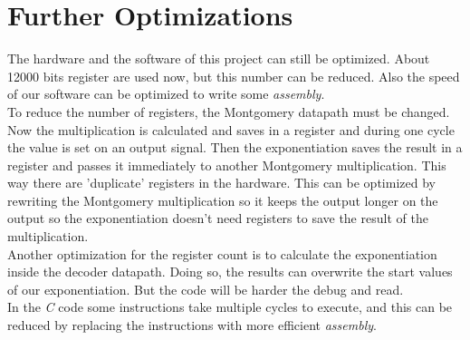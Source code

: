 \documentclass[a4paper]{article}
\begin{document}
\section{Further Optimizations}

The hardware and the software of this project can still be optimized. About 12000 bits register are used now, but this number can be reduced. Also the speed of our software can be optimized to write some \textit{assembly}.\\

To reduce the number of registers, the Montgomery datapath must be changed. Now the multiplication is calculated and saves in a register and during one cycle the value is set on an output signal. Then the exponentiation saves the result in a register and passes it immediately to another Montgomery multiplication. This way there are 'duplicate' registers in the hardware. This can be optimized by rewriting the Montgomery multiplication so it keeps the output longer on the output so the exponentiation doesn't need registers to save the result of the multiplication.\\

Another optimization for the register count is to calculate the exponentiation inside the decoder datapath. Doing so, the results can overwrite the start values of our exponentiation. But the code will be harder the debug and read.\\

In the \textit{C} code some instructions take multiple cycles to execute, and this can be reduced by replacing the instructions with more efficient \textit{assembly}.
\end{document}
